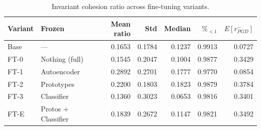 \begin{table}
\caption{Invariant cohesion ratio across fine-tuning variants.}
\label{tab:ch6_cohesion_table_ProtoVAE}
\begin{tabular}{llrrrrr}
\toprule
Variant & Frozen & Mean ratio & Std & Median & $\%_{<1}$ & $E[r_{PGD}^-]$ \\
\midrule
Base & — & 0.1653 & 0.1784 & 0.1237 & 0.9913 & 0.0727 \\
FT-0 & Nothing (full) & 0.1545 & 0.2047 & 0.1004 & 0.9877 & 0.3429 \\
FT-1 & Autoencoder & 0.2892 & 0.2701 & 0.1777 & 0.9770 & 0.0854 \\
FT-2 & Prototypes & 0.2200 & 0.1803 & 0.1823 & 0.9879 & 0.3784 \\
FT-3 & Classifier & 0.1360 & 0.3023 & 0.0653 & 0.9816 & 0.3401 \\
FT-E & Protos + Classifier & 0.1839 & 0.2672 & 0.1147 & 0.9821 & 0.3492 \\
\bottomrule
\end{tabular}
\end{table}
